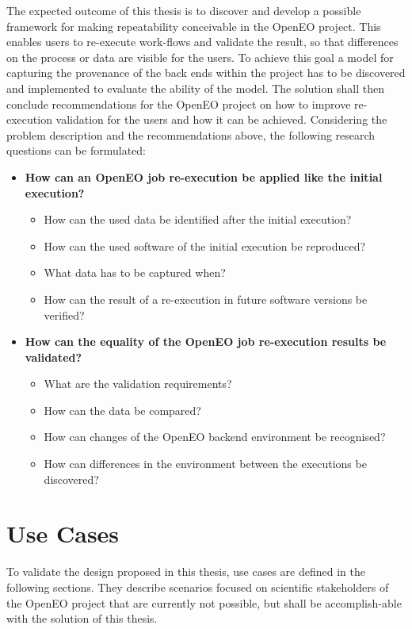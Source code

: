 \documentclass[draft,final]{vutinfth} %
\begin{document}
The expected outcome of this thesis is to discover and develop a possible framework for making repeatability conceivable in the OpenEO project. This enables users to re-execute work-flows and validate the result, so that differences on the process or data are visible for the users. To achieve this goal a model for capturing the provenance of the back ends within the project has to be discovered and implemented to evaluate the ability of the model. The solution shall then conclude recommendations for the OpenEO project on how to improve re-execution validation for the users and how it can be achieved. Considering the problem description and the recommendations above, the following research questions can be formulated:

\begin{itemize}
	\item \textbf{How can an OpenEO job re-execution be applied like the initial execution?}
	\begin{itemize}
		\item How can the used data be identified after the initial execution?
		\item How can the used software of the initial execution be reproduced?
		\item What data has to be captured when?
		\item How can the result of a re-execution in future software versions be verified?
	\end{itemize}
	\item \textbf{How can the equality of the OpenEO job re-execution results be validated?}
	\begin{itemize}
		\item What are the validation requirements?
		\item How can the data be compared?
		\item How can changes of the OpenEO backend environment be recognised?
		\item How can differences in the environment between the executions be discovered?
	\end{itemize}
\end{itemize}

\section{Use Cases}\label{Use Cases}
To validate the design proposed in this thesis, use cases are defined in the following sections. They describe scenarios focused on scientific stakeholders of the OpenEO project that are currently not possible, but shall be accomplish-able with the solution of this thesis.
    
\end{document}
